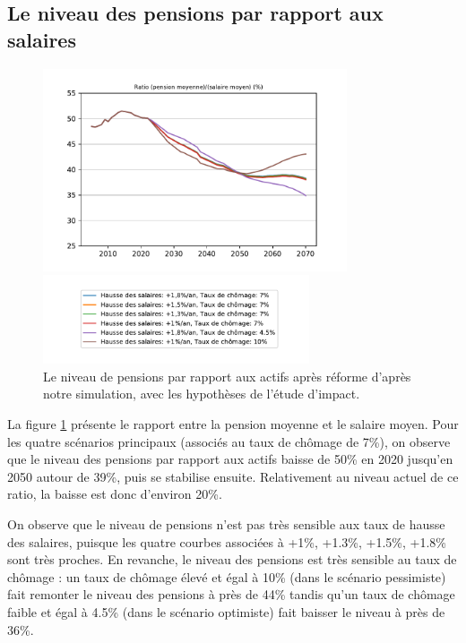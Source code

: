 \documentclass[10pt]{article}
\begin{document}

\subsection{Le niveau des pensions par rapport aux salaires}

\begin{figure}
\begin{center}
\includegraphics[width=0.8\textwidth]{Simulation-P.pdf}

\includegraphics[width=0.7\textwidth]{Simulation-legende.pdf}
\end{center}

\caption{Le niveau de pensions par rapport aux actifs après réforme 
d'après notre simulation, avec les hypothèses de l'étude d'impact.}
\label{fig-simulation-P}
\end{figure}

La figure \ref{fig-simulation-P} présente le rapport entre la pension moyenne et le salaire moyen. 
Pour les quatre scénarios principaux (associés au taux de chômage 
de 7\%), on observe que le niveau des pensions par rapport aux actifs 
baisse de 50\% en 2020 jusqu'en 2050 autour de 39\%, puis se stabilise ensuite. 
Relativement au niveau actuel de ce ratio, la baisse est donc d'environ 20\%. 

On observe que le niveau de pensions n'est pas très sensible 
aux taux de hausse des salaires, puisque les quatre courbes associées 
à +1\%, +1.3\%, +1.5\%,  +1.8\% sont très proches. 
En revanche, le niveau des pensions est très sensible au taux de chômage : 
un taux de chômage élevé et égal à 10\% (dans le scénario pessimiste) 
fait remonter le niveau des pensions à près de 44\% tandis qu'un taux de 
chômage faible et égal à 4.5\% (dans le scénario optimiste) fait baisser 
le niveau à près de 36\%. 
\end{document}
